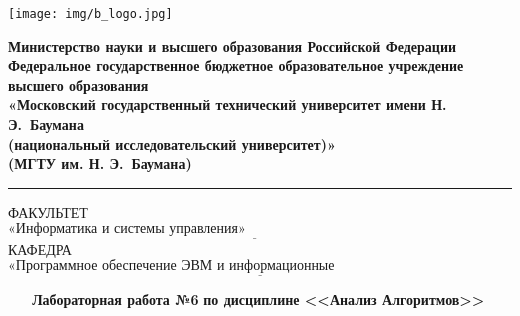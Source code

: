 \documentclass{bmstu}
\begin{document}
\renewcommand{\thelstlisting}{\arabic{lstlisting}}

\begin{titlepage}
	\fontsize{12pt}{12pt}\selectfont
	\noindent \begin{minipage}{0.15\textwidth}
		\texttt{[image: img/b\_logo.jpg]}
	\end{minipage}
	\noindent\begin{minipage}{0.9\textwidth}\centering
		\textbf{Министерство науки и высшего образования Российской Федерации}\\
		\textbf{Федеральное государственное бюджетное образовательное учреждение высшего образования}\\
		\textbf{«Московский государственный технический университет имени Н. Э.~Баумана}\\
		\textbf{(национальный исследовательский университет)»}\\
		\textbf{(МГТУ им. Н. Э.~Баумана)}
	\end{minipage}

	\noindent\rule{18cm}{3pt}
	\newline\newline
	\noindent ФАКУЛЬТЕТ $\underline{\text{«Информатика и системы управления»~~~~~~~~~~~~~~~~~~~~~~~~~~~~~~~~~~~~~~~~~~~~~~~~~~~~~~~}}$ \newline\newline
	\noindent КАФЕДРА $\underline{\text{«Программное обеспечение ЭВМ и информационные технологии»~~~~~~~~~~~~~~~~~~~~~~~}}$\newline\newline\newline\newline\newline\newline\newline


	\begin{center}
		\noindent\begin{minipage}{1.3\textwidth}\centering
		\Large\textbf{~~~Лабораторная работа №6}\newline
		\textbf{по дисциплине <<Анализ Алгоритмов>>}\newline\newline\newline
		\end{minipage}
	\end{center}


\end{titlepage}
\end{document}
